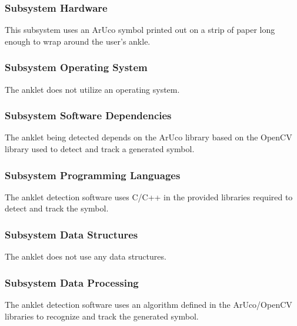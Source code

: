 \subsubsection{Subsystem Hardware}
This subsystem uses an ArUco symbol printed out on a strip of paper long enough to wrap around the user's ankle.

\subsubsection{Subsystem Operating System}
The anklet does not utilize an operating system.

\subsubsection{Subsystem Software Dependencies}
The anklet being detected depends on the ArUco library based on the OpenCV library used to detect and track a generated symbol.

\subsubsection{Subsystem Programming Languages}
The anklet detection software uses C/C++ in the provided libraries required to detect and track the symbol.

\subsubsection{Subsystem Data Structures}
The anklet does not use any data structures.

\subsubsection{Subsystem Data Processing}
The anklet detection software uses an algorithm defined in the ArUco/OpenCV libraries to recognize and track the generated symbol.
